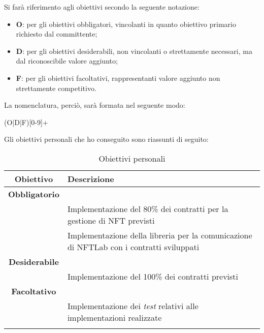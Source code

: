 \noindent Si farà riferimento agli obiettivi secondo la seguente notazione:
\begin{itemize}
  \item \textbf{O}: per gli obiettivi obbligatori, vincolanti in quanto obiettivo primario richiesto dal committente;
  \item \textbf{D}: per gli obiettivi desiderabili, non vincolanti o strettamente necessari, ma dal riconoscibile valore aggiunto;
  \item \textbf{F}: per gli obiettivi facoltativi, rappresentanti valore aggiunto non strettamente competitivo.
\end{itemize}

\noindent La nomenclatura, perciò, sarà formata nel seguente modo:
\begin{center}
  (O|D|F)[0-9]+
\end{center}

\noindent Gli obiettivi personali che ho conseguito sono riassunti di seguito:
\begin{longtabu}{|c|X|}
  \hline

  \textbf{Obiettivo} & \textbf{Descrizione} \\ \hline

  \textbf{Obbligatorio} & \\

   \label{personal-goal:O.smart-contract} & Implementazione del 80\% dei contratti per la gestione di NFT previsti \\
   \label{personal-goal:O.library} & Implementazione della libreria per la comunicazione di NFTLab con i contratti sviluppati \\

  \hline

  \textbf{Desiderabile} &  \\
  
   \label{personal-goal:D.smart-contract} & Implementazione del 100\% dei contratti previsti \\

  \hline

  \textbf{Facoltativo} & \\

   \label{personal-goal:F.tests} & Implementazione dei \textit{test} relativi alle implementazioni realizzate \\

  \hline

  \caption{Obiettivi personali}
\end{longtabu}
